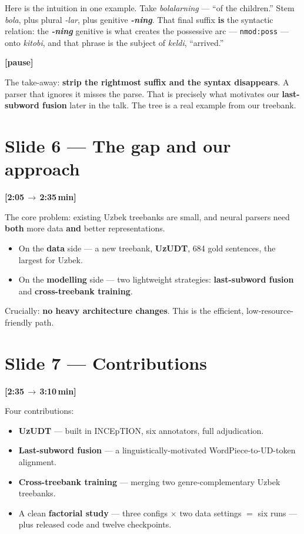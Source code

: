 \documentclass[12pt,a4paper]{article}
\newcommand{\timing}[2]{%
   \par\noindent\textbf{\small [#1\,$\to$\,#2\,min]}\par\vspace{0.2em}}
\newcommand{\say}[1]{\textbf{#1}}
\newcommand{\pause}{\par\vspace{0.4em}\textbf{[pause]}\par}
\begin{document}
Here is the intuition in one example. Take \textit{bolalarning} --- ``of
the children.'' Stem \textit{bola}, plus plural \textit{-lar}, plus
genitive \textbf{\textit{-ning}}. That final suffix \textbf{is} the
syntactic relation: the \textbf{\textit{-ning}} genitive is what creates
the possessive arc --- \texttt{nmod:poss} --- onto \textit{kitobi}, and
that phrase is the subject of \textit{keldi}, ``arrived.''

\pause

The take-away: \say{strip the rightmost suffix and the syntax
disappears}. A parser that ignores it misses the parse. That is precisely
what motivates our \textbf{last-subword fusion} later in the talk. The
tree is a real example from our treebank.

\section*{Slide 6 --- The gap and our approach}
\timing{2:05}{2:35}

The core problem: existing Uzbek treebanks are small, and neural parsers
need \say{both} more data \say{and} better representations.

\begin{itemize}
   \item On the \textbf{data} side --- a new treebank, \textbf{UzUDT}, 684 gold sentences, the largest for Uzbek.
   \item On the \textbf{modelling} side --- two lightweight strategies: \textbf{last-subword fusion} and \textbf{cross-treebank training}.
\end{itemize}

\noindent
Crucially: \say{no heavy architecture changes}. This is the efficient,
low-resource-friendly path.

\section*{Slide 7 --- Contributions}
\timing{2:35}{3:10}

Four contributions:

\begin{itemize}
   \item \textbf{UzUDT} --- built in INCEpTION, six annotators, full adjudication.
   \item \textbf{Last-subword fusion} --- a linguistically-motivated WordPiece-to-UD-token alignment.
   \item \textbf{Cross-treebank training} --- merging two genre-complementary Uzbek treebanks.
   \item A clean \textbf{factorial study} --- three configs $\times$ two data settings $=$ six runs --- plus released code and twelve checkpoints.
\end{itemize}
\end{document}
